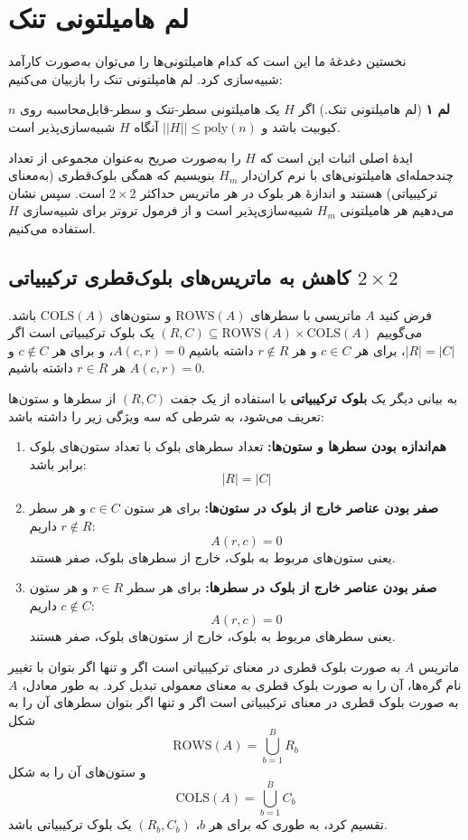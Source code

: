 \section{ لم هامیلتونی تنک}
نخستین دغدغهٔ ما این است که کدام هامیلتونی‌ها را می‌توان به‌صورت کارآمد شبیه‌سازی کرد. لم هامیلتونی تنک را بازبیان می‌کنیم:

\textbf{لم ۱} (لم هامیلتونی تنک.) اگر $H$ یک هامیلتونی سطر-تنک و سطر-قابل‌محاسبه روی $n$ کیوبیت باشد و $||H|| \le \mathrm{poly}(n)$ آنگاه $H$ شبیه‌سازی‌پذیر است.

ایدهٔ اصلی اثبات این است که $H$ را به‌صورت صریح به‌عنوان مجموعی از تعداد چندجمله‌ای هامیلتونی‌های با نرم کران‌دار $H_m$ بنویسیم که همگی بلوک‌قطری (به‌معنای ترکیبیاتی) هستند و اندازهٔ هر بلوک در هر ماتریس حداکثر $2 \times 2$ است. سپس نشان می‌دهیم هر هامیلتونی $H_m$ شبیه‌سازی‌پذیر است و از فرمول تروتر برای شبیه‌سازی $H$ استفاده می‌کنیم.

\subsection{ کاهش به ماتریس‌های بلوک‌قطری ترکیبیاتی $2 \times 2$}
 \begin{defn}
  فرض کنید $A$ ماتریسی با سطرهای $\mathrm{ROWS}(A)$ و ستون‌های $\mathrm{COLS}(A)$ باشد. می‌گوییم $(R, C) \subseteq \mathrm{ROWS}(A) \times \mathrm{COLS}(A)$ یک بلوک ترکیبیاتی است اگر $|R| = |C|$، برای هر $c \in C$ و هر $r \notin R$ داشته باشیم $A(c,r) = 0$، و برای هر $c \notin C$ و هر $r \in R$ داشته باشیم 
  $A(c,r) = 0$.
 \end{defn}
به بیانی دیگر یک \textbf{بلوک ترکیبیاتی} با استفاده از یک جفت $(R, C)$ از سطرها و ستون‌ها تعریف می‌شود، به شرطی که سه ویژگی زیر را داشته باشد:
\begin{enumerate}
	\item \textbf{هم‌اندازه بودن سطرها و ستون‌ها:}  
	تعداد سطرهای بلوک با تعداد ستون‌های بلوک برابر باشد:  
	\[
	|R| = |C|
	\]
	\item \textbf{صفر بودن عناصر خارج از بلوک در ستون‌ها:}  
	برای هر ستون $c \in C$ و هر سطر $r \notin R$ داریم:  
	\[
	A(r,c) = 0
	\]  
	یعنی ستون‌های مربوط به بلوک، خارج از سطرهای بلوک، صفر هستند.
	\item \textbf{صفر بودن عناصر خارج از بلوک در سطرها:}  
	برای هر سطر $r \in R$ و هر ستون $c \notin C$ داریم:  
	\[
	A(r,c) = 0
	\]  
	یعنی سطرهای مربوط به بلوک، خارج از ستون‌های بلوک، صفر هستند.
\end{enumerate}
ماتریس $A$ به صورت بلوک قطری در معنای ترکیبیاتی است اگر و تنها اگر بتوان با تغییر نام گره‌ها، آن را به صورت بلوک قطری به معنای معمولی تبدیل کرد. به طور معادل، $A$ به صورت بلوک قطری در معنای ترکیبیاتی است اگر و تنها اگر بتوان سطرهای آن را به شکل  
\[
\mathrm{ROWS}(A) = \bigcup_{b=1}^B R_b
\]  
و ستون‌های آن را به شکل  
\[
\mathrm{COLS}(A) = \bigcup_{b=1}^B C_b
\]  
تقسیم کرد، به طوری که برای هر $b$، $(R_b, C_b)$ یک بلوک ترکیبیاتی باشد.  

